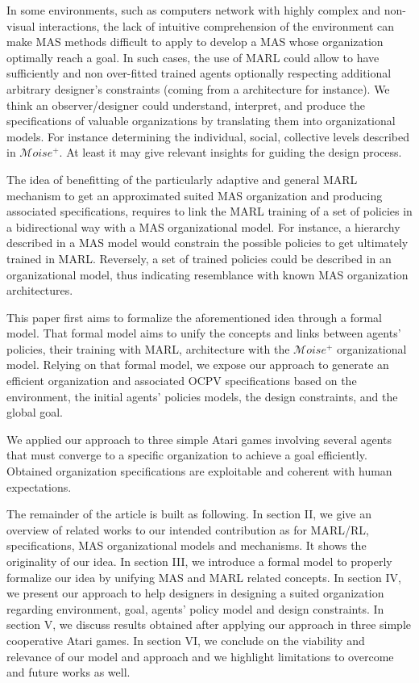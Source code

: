 \documentclass[runningheads]{llncs}
\begin{document}
In some environments, such as computers network with highly complex and non-visual interactions, the lack of intuitive comprehension of the environment can make MAS methods difficult to apply to develop a MAS whose organization optimally reach a goal. In such cases, the use of MARL could allow to have sufficiently and non over-fitted trained agents optionally respecting additional arbitrary designer's constraints (coming from a architecture for instance). We think an observer/designer could understand, interpret, and produce the specifications of valuable organizations by translating them into organizational models. For instance determining the individual, social, collective levels described in $\mathcal{M}oise^{+}$\cite{Hubner2002}. At least it may give relevant insights for guiding the design process.

The idea of benefitting of the particularly adaptive and general MARL mechanism to get an approximated suited MAS organization and producing associated specifications, requires to link the MARL training of a set of policies in a bidirectional way with a MAS organizational model. For instance, a hierarchy described in a MAS model would constrain the possible policies to get ultimately trained in MARL. Reversely, a set of trained policies could be described in an organizational model, thus indicating resemblance with known MAS organization architectures.

This paper first aims to formalize the aforementioned idea through a formal model. That formal model aims to unify the concepts and links between agents' policies, their training with MARL, architecture with the $\mathcal{M}oise^{+}$ organizational model. Relying on that formal model, we expose our approach to generate an efficient organization and associated OCPV specifications based on the environment, the initial agents' policies models, the design constraints, and the global goal.

We applied our approach to three simple Atari games involving several agents that must converge to a specific organization to achieve a goal efficiently. Obtained organization specifications are exploitable and coherent with human expectations.

The remainder of the article is built as following.
In section II, we give an overview of related works to our intended contribution as for MARL/RL, specifications, MAS organizational models and mechanisms. It shows the originality of our idea.
In section III, we introduce a formal model to properly formalize our idea by unifying MAS and MARL related concepts.
In section IV, we present our approach to help designers in designing a suited organization regarding environment, goal, agents' policy model and design constraints.
In section V, we discuss results obtained after applying our approach in three simple cooperative Atari games.
In section VI, we conclude on the viability and relevance of our model and approach and we highlight limitations to overcome and future works as well.
\end{document}
